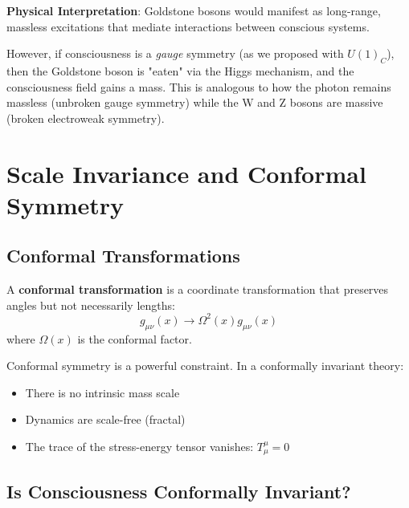 \textbf{Physical Interpretation}: Goldstone bosons would manifest as long-range, massless excitations that mediate interactions between conscious systems.

However, if consciousness is a \textit{gauge} symmetry (as we proposed with $U(1)_C$), then the Goldstone boson is "eaten" via the Higgs mechanism, and the consciousness field gains a mass. This is analogous to how the photon remains massless (unbroken gauge symmetry) while the W and Z bosons are massive (broken electroweak symmetry).

\section{Scale Invariance and Conformal Symmetry}

\subsection{Conformal Transformations}

\begin{definition}\label{def:conformal-transformation}
A \textbf{conformal transformation} is a coordinate transformation that preserves angles but not necessarily lengths:
\begin{equation}
g_{\mu\nu}(x) \to \Omega^2(x) g_{\mu\nu}(x)
\end{equation}
where $\Omega(x)$ is the conformal factor.
\end{definition}

Conformal symmetry is a powerful constraint. In a conformally invariant theory:
\begin{itemize}
\item There is no intrinsic mass scale
\item Dynamics are scale-free (fractal)
\item The trace of the stress-energy tensor vanishes: $T^\mu_\mu = 0$
\end{itemize}

\subsection{Is Consciousness Conformally Invariant?}

